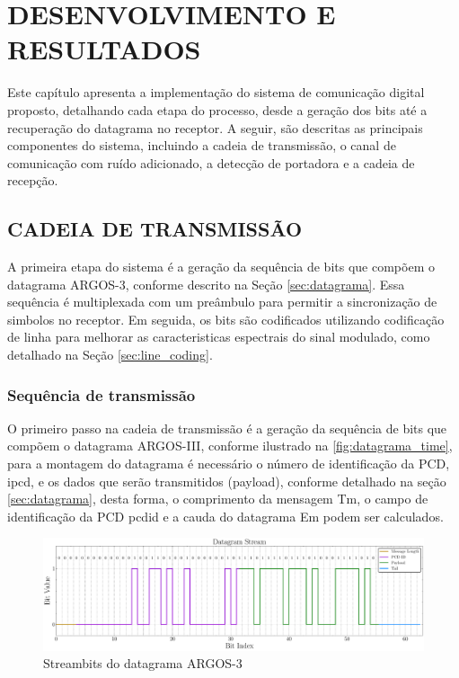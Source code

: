 \chapter{DESENVOLVIMENTO E RESULTADOS}\label{cap:desenvolvimento}

Este capítulo apresenta a implementação do sistema de comunicação digital proposto, detalhando cada etapa do processo, desde a geração dos bits até a recuperação do datagrama no receptor. A seguir, são descritas as principais componentes do sistema, incluindo a cadeia de transmissão, o canal de comunicação com ruído adicionado, a detecção de portadora e a cadeia de recepção.

\section{CADEIA DE TRANSMISSÃO}\label{sec:transmissao}

A primeira etapa do sistema é a geração da sequência de bits que compõem o datagrama ARGOS-3, conforme descrito na Seção \ref{sec:datagrama}. Essa sequência é multiplexada com um preâmbulo para permitir a sincronização de simbolos no receptor. Em seguida, os bits são codificados utilizando codificação de linha para melhorar as caracteristicas espectrais do sinal modulado, como detalhado na Seção \ref{sec:line_coding}.

\subsection{Sequência de transmissão}\label{sec:geracao_bits}

O primeiro passo na cadeia de transmissão é a geração da sequência de bits que compõem o datagrama \gls{ARGOS-III}, conforme ilustrado na \autoref{fig:datagrama_time}, para a montagem do datagrama é necessário o número de identificação da PCD, \gls{ipcd}, e os dados que serão transmitidos (payload), conforme detalhado na seção \ref{sec:datagrama}, desta forma, o comprimento da mensagem \gls{Tm}, o campo de identificação da PCD \gls{pcdid} e a cauda do datagrama \gls{Em} podem ser calculados. 

\begin{figure}[H]
	\centering
	\caption{Streambits do datagrama ARGOS-3}\label{fig:datagrama_time}
	\includegraphics[width=\linewidth]{assets/cap3/transmitter_datagram_time.pdf}
\end{figure}

